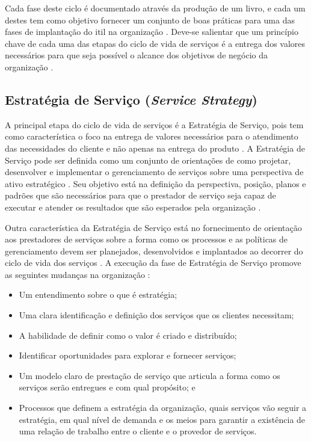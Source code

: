 Cada fase deste ciclo é documentado através da produção de um livro, e cada um destes tem como objetivo fornecer um conjunto de boas práticas para uma das fases de implantação do \acrshort{itil} na organização \cite{servicestrategy, introductoryoverviewofitil, arraj2010itil}. Deve-se salientar que um princípio chave de cada uma das etapas do ciclo de vida de serviços é a entrega dos valores necessários para que seja possível o alcance dos objetivos de negócio da organização \cite{commerce2007official}.

\subsection*{Estratégia de Serviço (\textit{Service Strategy})}

\noindent A principal etapa do ciclo de vida de serviços é a Estratégia de Serviço, pois tem como característica o foco na entrega de valores necessários para o atendimento das necessidades do cliente e não apenas na entrega do produto \cite{introductoryoverviewofitil}. A Estratégia de Serviço pode ser definida como um conjunto de orientações de como projetar, desenvolver e implementar o gerenciamento de serviços sobre uma perspectiva de ativo estratégico \cite{itilimplementationfailure}. Seu objetivo está na definição da perspectiva, posição, planos e padrões que são necessários para que o prestador de serviço seja capaz de executar e atender os resultados que são esperados pela organização \cite{servicestrategy}.

Outra característica da Estratégia de Serviço está no fornecimento de orientação aos prestadores de serviços sobre a forma como os processos e as políticas de gerenciamento devem ser planejados, desenvolvidos e implantados ao decorrer do ciclo de vida dos serviços \cite{abreu2012implantando}. A execução da fase de Estratégia de Serviço promove as seguintes mudanças na organização \cite{servicestrategy}:

\begin{itemize}
    \item Um entendimento sobre o que é estratégia;
    \item Uma clara identificação e definição dos serviços que os clientes necessitam;
    \item A habilidade de definir como o valor é criado e distribuído;
    \item Identificar oportunidades para explorar e fornecer serviços;
    \item Um modelo claro de prestação de serviço que articula a forma como os serviços serão entregues e com qual propósito; e
    \item Processos que definem a estratégia da organização, quais serviços vão seguir a estratégia, em qual nível de demanda e os meios para garantir a existência de uma relação de trabalho entre o cliente e o provedor de serviços.
\end{itemize}


